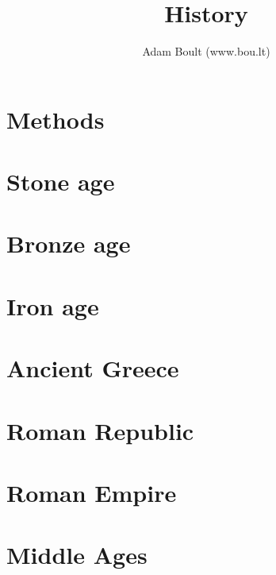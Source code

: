 \documentclass[oneside]{book}
\begin{document}
\author{Adam Boult (www.bou.lt)}
\title{History}
\maketitle

\setcounter{tocdepth}{0}
\tableofcontents



\part{Methods}




\part{Stone age}




\part{Bronze age}





\part{Iron age}

\part{Ancient Greece}






\part{Roman Republic}


\part{Roman Empire}





\part{Middle Ages}



\end{document}
